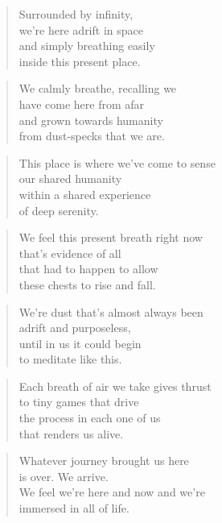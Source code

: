 \documentclass[10pt,a4paper]{article}
\begin{document}
\begin{multicols}{2}


\begin{verse}
Surrounded by infinity,\\
we’re here adrift in space\\
and simply breathing easily\\
inside this present place.
\end{verse}

\begin{verse}
We calmly breathe, recalling we\\
have come here from afar\\
and grown towards humanity\\
from dust-specks that we are.
\end{verse}

\begin{verse}
This place is where we’ve come to sense\\
our shared humanity\\
within a shared experience\\
of deep serenity.
\end{verse}

\begin{verse}
We feel this present breath right now\\
that’s evidence of all\\
that had to happen to allow\\
these chests to rise and fall.
\end{verse}

\begin{verse}
We’re dust that’s almost always been\\
adrift and purposeless,\\
until in us it could begin\\
to meditate like this.
\end{verse}

\begin{verse}
Each breath of air we take gives thrust\\
to tiny games that drive\\
the process in each one of us\\
that renders us alive.
\end{verse}

\begin{verse}
Whatever journey brought us here\\
is over. We arrive.\\
We feel we’re here and now and we’re\\
immersed in all of life.
\end{verse}


\end{multicols}
\end{document}
